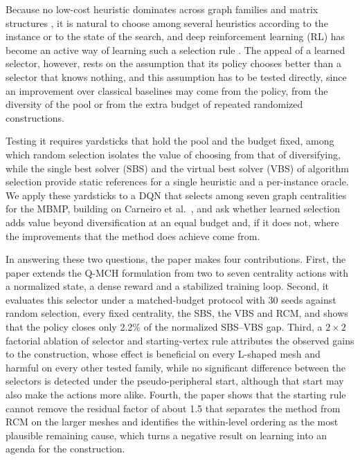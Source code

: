 \documentclass[runningheads]{llncs}
\begin{document}
Because no low-cost heuristic dominates across graph families and matrix structures \cite{gonzaga2025}, it is natural to choose among several heuristics according to the instance or to the state of the search, and deep reinforcement learning (RL) has become an active way of learning such a selection rule \cite{burke2013,mazyavkina2021,kallestad2023}. The appeal of a learned selector, however, rests on the assumption that its policy chooses better than a selector that knows nothing, and this assumption has to be tested directly, since an improvement over classical baselines may come from the policy, from the diversity of the pool or from the extra budget of repeated randomized constructions.

Testing it requires yardsticks that hold the pool and the budget fixed, among which random selection isolates the value of choosing from that of diversifying, while the single best solver (SBS) and the virtual best solver (VBS) of algorithm selection \cite{kerschke2019} provide static references for a single heuristic and a per-instance oracle. We apply these yardsticks to a DQN that selects among seven graph centralities for the MBMP, building on Carneiro et al.\ \cite{carneiro2024qmch}, and ask whether learned selection adds value beyond diversification at an equal budget and, if it does not, where the improvements that the method does achieve come from.

In answering these two questions, the paper makes four contributions. First, the paper extends the Q-MCH formulation \cite{carneiro2024qmch} from two to seven centrality actions with a normalized state, a dense reward and a stabilized training loop. Second, it evaluates this selector under a matched-budget protocol with 30 seeds against random selection, every fixed centrality, the SBS, the VBS and RCM, and shows that the policy closes only 2.2\% of the normalized SBS--VBS gap. Third, a $2\times2$ factorial ablation of selector and starting-vertex rule attributes the observed gains to the construction, whose effect is beneficial on every L-shaped mesh and harmful on every other tested family, while no significant difference between the selectors is detected under the pseudo-peripheral start, although that start may also make the actions more alike. Fourth, the paper shows that the starting rule cannot remove the residual factor of about 1.5 that separates the method from RCM on the larger meshes and identifies the within-level ordering as the most plausible remaining cause, which turns a negative result on learning into an agenda for the construction.
\end{document}
